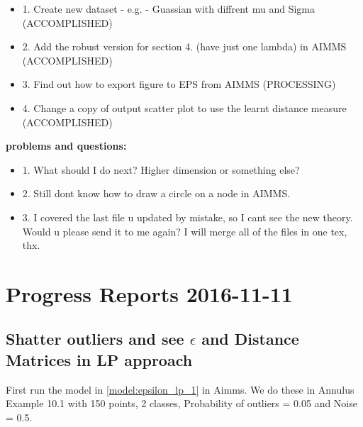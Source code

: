 \documentclass[]{article}
\begin{document}
\begin{itemize}
\item 1. Create new dataset - e.g.  - Guassian with diffrent mu and Sigma (ACCOMPLISHED)

\item 2. Add the robust version for section 4. (have just one lambda) in AIMMS (ACCOMPLISHED)

\item 3. Find out how to export figure to EPS from AIMMS (PROCESSING)

\item 4. Change a copy of output scatter plot to use the learnt distance measure (ACCOMPLISHED)


\end{itemize}
{\bf problems and questions:}
\begin{itemize}
\item 1. What should I do next? Higher dimension or something else?

\item 2. Still dont know how to draw a circle on a node in AIMMS.

\item 3. I covered the last file u updated by mistake, so I cant see the new theory. Would u please send it to me again? I will merge all of the files in one tex, thx.


\end{itemize}


\newpage
\section{Progress Reports 2016-11-11}

\subsection{Shatter outliers and see $\epsilon$ and Distance Matrices in LP approach}

First run the model in \eqref{model:epsilon_lp_1} in Aimms. 
We do these in Annulus Example 10.1 with 150 points, 2 classes, Probability of outliers = 0.05 and Noise = 0.5.
\end{document}
